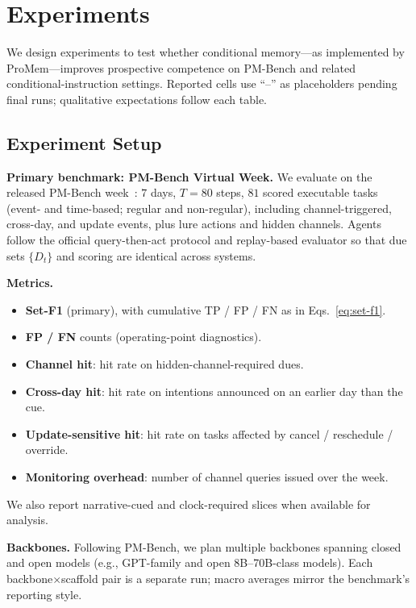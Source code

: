 \section{Experiments}
\label{sec:experiments}

We design experiments to test whether conditional memory---as implemented by ProMem---improves prospective competence on PM-Bench and related conditional-instruction settings. Reported cells use ``--'' as placeholders pending final runs; qualitative expectations follow each table.
\vspace{10pt}
\subsection{Experiment Setup}

\noindent\textbf{Primary benchmark: PM-Bench Virtual Week.}
We evaluate on the released PM-Bench week~\cite{pmbench2026}: $7$ days, $T{=}80$ steps, $81$ scored executable tasks (event- and time-based; regular and non-regular), including channel-triggered, cross-day, and update events, plus lure actions and hidden channels. Agents follow the official query-then-act protocol and replay-based evaluator so that due sets $\{D_t\}$ and scoring are identical across systems.

\noindent\textbf{Metrics.}
\begin{itemize}
    \item \textbf{Set-F1} (primary), with cumulative TP / FP / FN as in Eqs.~\eqref{eq:set-f1}.
    \item \textbf{FP / FN} counts (operating-point diagnostics).
    \item \textbf{Channel hit}: hit rate on hidden-channel-required dues.
    \item \textbf{Cross-day hit}: hit rate on intentions announced on an earlier day than the cue.
    \item \textbf{Update-sensitive hit}: hit rate on tasks affected by cancel / reschedule / override.
    \item \textbf{Monitoring overhead}: number of channel queries issued over the week.
\end{itemize}
We also report narrative-cued and clock-required slices when available for analysis.

\noindent\textbf{Backbones.}
Following PM-Bench, we plan multiple backbones spanning closed and open models (e.g., GPT-family and open 8B--70B-class models). Each backbone$\times$scaffold pair is a separate run; macro averages mirror the benchmark's reporting style.

